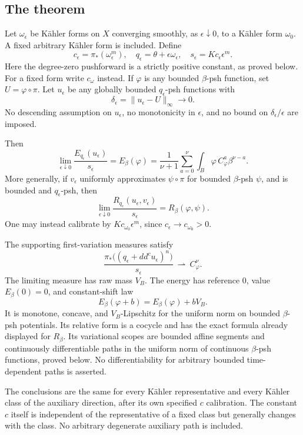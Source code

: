 \documentclass[
  11pt,
]{article}
\begin{document}
\subsection{The theorem}\label{the-theorem}

Let \(\omega_\epsilon\) be Kähler forms on \(X\) converging smoothly, as
\(\epsilon\downarrow0\), to a Kähler form \(\omega_0\). A fixed
arbitrary Kähler form is included. Define
\[c_\epsilon=\pi_*(\omega_\epsilon^m),\quad
q_\epsilon=\theta+\epsilon\omega_\epsilon,\quad
s_\epsilon=Kc_\epsilon\epsilon^m.\] Here the degree-zero pushforward is
a strictly positive constant, as proved below. For a fixed form write
\(c_\omega\) instead. If \(\varphi\) is any bounded \(\beta\)-psh
function, set \(U=\varphi\circ\pi\). Let \(u_\epsilon\) be any globally
bounded \(q_\epsilon\)-psh functions with
\[\delta_\epsilon=\|u_\epsilon-U\|_\infty\longrightarrow0.\] No
descending assumption on \(u_\epsilon\), no monotonicity in
\(\epsilon\), and no bound on \(\delta_\epsilon/\epsilon\) are imposed.

Then
\[\lim_{\epsilon\downarrow0}\frac{E_{q_\epsilon}(u_\epsilon)}{s_\epsilon}
=E_\beta(\varphi)
=\frac1{\nu+1}\sum_{a=0}^\nu\int_B\varphi\,C_\varphi^a\beta^{\nu-a}. \tag{1}\]
More generally, if \(v_\epsilon\) uniformly approximates
\(\psi\circ\pi\) for bounded \(\beta\)-psh \(\psi\), and is bounded and
\(q_\epsilon\)-psh, then
\[\lim_{\epsilon\downarrow0}\frac{R_{q_\epsilon}(u_\epsilon,v_\epsilon)}{s_\epsilon}
=R_\beta(\varphi,\psi). \tag{2}\] One may instead calibrate by
\(Kc_{\omega_0}\epsilon^m\), since \(c_\epsilon\to c_{\omega_0}>0\).

The supporting first-variation measures satisfy
\[\frac{\pi_*\big((q_\epsilon+dd^cu_\epsilon)^n\big)}{s_\epsilon}
\ \rightharpoonup\ C_\varphi^\nu. \tag{3}\] The limiting measure has raw
mass \(V_B\). The energy has reference \(0\), value \(E_\beta(0)=0\),
and constant-shift law
\[E_\beta(\varphi+b)=E_\beta(\varphi)+bV_B. \tag{4}\] It is monotone,
concave, and \(V_B\)-Lipschitz for the uniform norm on bounded
\(\beta\)-psh potentials. Its relative form is a cocycle and has the
exact formula already displayed for \(R_\beta\). Its variational scopes
are bounded affine segments and continuously differentiable paths in the
uniform norm of continuous \(\beta\)-psh functions, proved below. No
differentiability for arbitrary bounded time-dependent paths is
asserted.

The conclusions are the same for every Kähler representative and every
Kähler class of the auxiliary direction, after its own specified \(c\)
calibration. The constant \(c\) itself is independent of the
representative of a fixed class but generally changes with the class. No
arbitrary degenerate auxiliary path is included.
\end{document}
